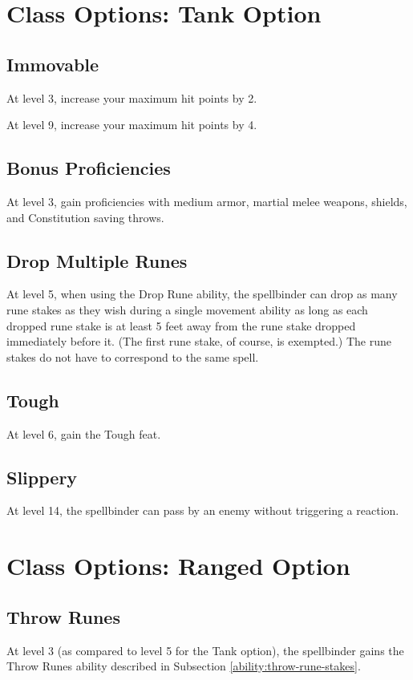 \section{Class Options: Tank Option}
\subsection{Immovable}
At level 3, increase your maximum hit points by 2.

At level 9, increase your maximum hit points by 4.

\subsection{Bonus Proficiencies}
At level 3, gain proficiencies with medium armor, martial melee weapons, shields, and Constitution saving throws.

\subsection{Drop Multiple Runes}
At level 5, when using the Drop Rune ability, the spellbinder can drop as many rune stakes as they wish during a single movement ability as long as each dropped rune stake is at least 5 feet away from the rune stake dropped immediately before it. (The first rune stake, of course, is exempted.) The rune stakes do not have to correspond to the same spell.

\subsection{Tough}
At level 6, gain the Tough feat.

\subsection{Slippery}
At level 14, the spellbinder can pass by an enemy without triggering a reaction.

\section{Class Options: Ranged Option}
\subsection{Throw Runes}
At level 3 (as compared to level 5 for the Tank option), the spellbinder gains the Throw Runes ability described in Subsection \ref{ability:throw-rune-stakes}.

